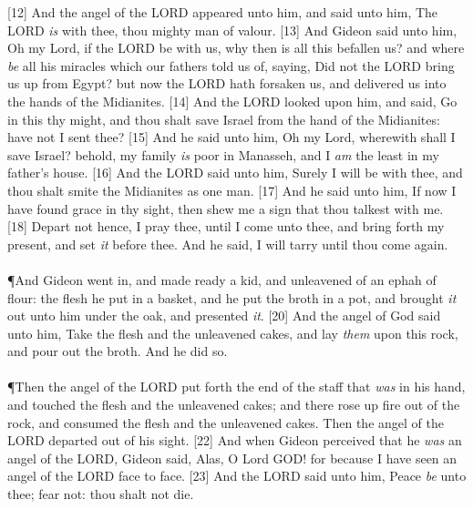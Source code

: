 [12] \textcolor[cmyk]{0.99998,1,0,0}{And the angel of the LORD appeared unto him, and said unto him, The LORD \emph{is} with thee, thou mighty man of valour.}
[13] \textcolor[cmyk]{0.99998,1,0,0}{And Gideon said unto him, Oh my Lord, if the LORD be with us, why then is all this befallen us? and where \emph{be} all his miracles which our fathers told us of, saying, Did not the LORD bring us up from Egypt? but now the LORD hath forsaken us, and delivered us into the hands of the Midianites.}
[14] \textcolor[cmyk]{0.99998,1,0,0}{And the LORD looked upon him, and said, Go in this thy might, and thou shalt save Israel from the hand of the Midianites: have not I sent thee?}
[15] \textcolor[cmyk]{0.99998,1,0,0}{And he said unto him, Oh my Lord, wherewith shall I save Israel? behold, my family \emph{is} poor in Manasseh, and I \emph{am} the least in my father's house.}
[16] \textcolor[cmyk]{0.99998,1,0,0}{And the LORD said unto him, Surely I will be with thee, and thou shalt smite the Midianites as one man.}
[17] \textcolor[cmyk]{0.99998,1,0,0}{And he said unto him, If now I have found grace in thy sight, then shew me a sign that thou talkest with me.}
[18] \textcolor[cmyk]{0.99998,1,0,0}{Depart not hence, I pray thee, until I come unto thee, and bring forth my present, and set \emph{it} before thee. And he said, I will tarry until thou come again.}\\
\\
\P \textcolor[cmyk]{0.99998,1,0,0}{And Gideon went in, and made ready a kid, and unleavened  of an ephah of flour: the flesh he put in a basket, and he put the broth in a pot, and brought \emph{it} out unto him under the oak, and presented \emph{it}.}
[20] \textcolor[cmyk]{0.99998,1,0,0}{And the angel of God said unto him, Take the flesh and the unleavened cakes, and lay \emph{them} upon this rock, and pour out the broth. And he did so.}\\
\\
\P \textcolor[cmyk]{0.99998,1,0,0}{Then the angel of the LORD put forth the end of the staff that \emph{was} in his hand, and touched the flesh and the unleavened cakes; and there rose up fire out of the rock, and consumed the flesh and the unleavened cakes. Then the angel of the LORD departed out of his sight.}
[22] \textcolor[cmyk]{0.99998,1,0,0}{And when Gideon perceived that he \emph{was} an angel of the LORD, Gideon said, Alas, O Lord GOD! for because I have seen an angel of the LORD face to face.}
[23] \textcolor[cmyk]{0.99998,1,0,0}{And the LORD said unto him, Peace \emph{be} unto thee; fear not: thou shalt not die.}
